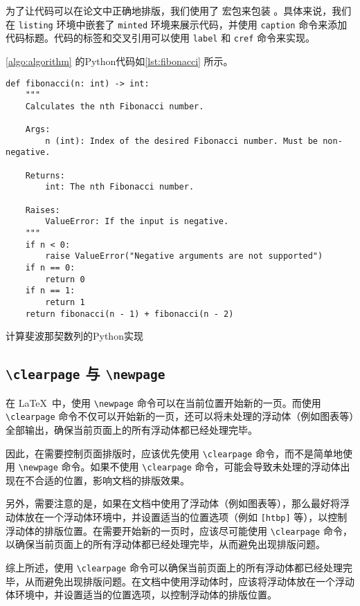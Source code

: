 为了让代码可以在论文中正确地排版，我们使用了  宏包来包装 。具体来说，我们在 \texttt{listing} 环境中嵌套了 \texttt{minted} 环境来展示代码，并使用 \texttt{caption} 命令来添加代码标题。代码的标签和交叉引用可以使用 \texttt{label} 和 \texttt{cref} 命令来实现。

\cref{algo:algorithm} 的Python代码如\cref{lst:fibonacci} 所示。



\begin{listing}[htbp]
  \begin{verbatim}
def fibonacci(n: int) -> int:
    """
    Calculates the nth Fibonacci number.

    Args:
        n (int): Index of the desired Fibonacci number. Must be non-negative.

    Returns:
        int: The nth Fibonacci number.

    Raises:
        ValueError: If the input is negative.
    """
    if n < 0:
        raise ValueError("Negative arguments are not supported")
    if n == 0:
        return 0
    if n == 1:
        return 1
    return fibonacci(n - 1) + fibonacci(n - 2)
  \end{verbatim}
  \caption{计算斐波那契数列的Python实现}\label{lst:fibonacci}
\end{listing}

\subsection{\texttt{\textbackslash{}clearpage} 与 \texttt{\textbackslash{}newpage}}

在 \LaTeX\ 中，使用 \verb|\newpage| 命令可以在当前位置开始新的一页。而使用 \verb|\clearpage| 命令不仅可以开始新的一页，还可以将未处理的浮动体（例如图表等）全部输出，确保当前页面上的所有浮动体都已经处理完毕。

因此，在需要控制页面排版时，应该优先使用 \verb|\clearpage| 命令，而不是简单地使用 \verb|\newpage| 命令。如果不使用 \verb|\clearpage| 命令，可能会导致未处理的浮动体出现在不合适的位置，影响文档的排版效果。

另外，需要注意的是，如果在文档中使用了浮动体（例如图表等），那么最好将浮动体放在一个浮动体环境中，并设置适当的位置选项（例如 \verb|[htbp]| 等），以控制浮动体的排版位置。在需要开始新的一页时，应该尽可能使用 \verb|\clearpage| 命令，以确保当前页面上的所有浮动体都已经处理完毕，从而避免出现排版问题。

综上所述，使用 \verb|\clearpage| 命令可以确保当前页面上的所有浮动体都已经处理完毕，从而避免出现排版问题。在文档中使用浮动体时，应该将浮动体放在一个浮动体环境中，并设置适当的位置选项，以控制浮动体的排版位置。